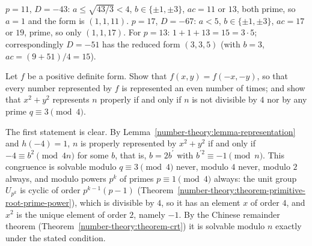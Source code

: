 \begin{solution}
$p = 11$, $D = -43$: $a \leq \sqrt{43/3} < 4$, $b \in \{\pm1, \pm3\}$, $ac = 11$ or $13$, both prime, so $a = 1$ and the form is $(1, 1, 11)$. $p = 17$, $D = -67$: $a < 5$, $b \in \{\pm1, \pm3\}$, $ac = 17$ or
$19$, prime, so only $(1, 1, 17)$. For $p = 13$: $1 + 1 + 13 = 15 = 3 \cdot 5$; correspondingly $D = -51$ has the reduced form $(3, 3, 5)$ (with $b = 3$, $ac = (9 + 51)/4 = 15$).
\end{solution}

\begin{exercise}\label{number-theory:exercise-represent-numbers}
Let $f$ be a positive definite form. Show that $f(x, y) = f(-x, -y)$, so that every number represented by $f$ is represented an even number of times; and show that $x^2 + y^2$ represents $n$ properly
if and only if $n$ is not divisible by $4$ nor by any prime $q \equiv 3 \pmod 4$.
\end{exercise}

\begin{solution}
The first statement is clear. By Lemma~\ref{number-theory:lemma-representation} and $h(-4) = 1$, $n$ is properly represented by $x^2 + y^2$ if and only if $-4 \equiv b^2 \pmod{4n}$ for some $b$, that is,
$b = 2b^{\prime}$ with $b^{\prime 2} \equiv -1 \pmod n$. This congruence is solvable modulo $q \equiv 3 \pmod 4$ never, modulo $4$ never, modulo $2$ always, and modulo powers $p^k$ of primes $p \equiv 1 \pmod 4$
always: the unit group $U_{p^k}$ is cyclic of order $p^{k-1}(p - 1)$ (Theorem~\ref{number-theory:theorem-primitive-root-prime-power}), which is divisible by $4$, so it has an element $x$ of order $4$,
and $x^2$ is the unique element of order $2$, namely $-1$. By the
Chinese remainder theorem (Theorem~\ref{number-theory:theorem-crt}) it is solvable modulo $n$ exactly under the stated condition.
\end{solution}
